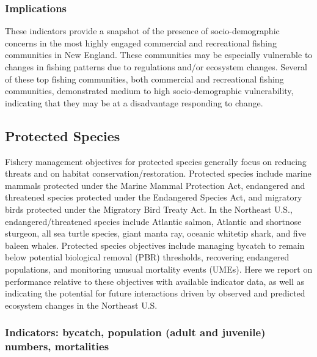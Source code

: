 \documentclass[
  10pt,
]{article}
\begin{document}
\hypertarget{implications-4}{%
\subsubsection{Implications}\label{implications-4}}

These indicators provide a snapshot of the presence of socio-demographic concerns in the most highly engaged commercial and recreational fishing communities in New England. These communities may be especially vulnerable to changes in fishing patterns due to regulations and/or ecosystem changes. Several of these top fishing communities, both commercial and recreational fishing communities, demonstrated medium to high socio-demographic vulnerability, indicating that they may be at a disadvantage responding to change.

\hypertarget{protected-species}{%
\subsection{Protected Species}\label{protected-species}}

Fishery management objectives for protected species generally focus on reducing threats and on habitat conservation/restoration. Protected species include marine mammals protected under the Marine Mammal Protection Act, endangered and threatened species protected under the Endangered Species Act, and migratory birds protected under the Migratory Bird Treaty Act. In the Northeast U.S., endangered/threatened species include Atlantic salmon, Atlantic and shortnose sturgeon, all sea turtle species, giant manta ray, oceanic whitetip shark, and five baleen whales. Protected species objectives include managing bycatch to remain below potential biological removal (PBR) thresholds, recovering endangered populations, and monitoring unusual mortality events (UMEs). Here we report on performance relative to these objectives with available indicator data, as well as indicating the potential for future interactions driven by observed and predicted ecosystem changes in the Northeast U.S.

\hypertarget{indicators-bycatch-population-adult-and-juvenile-numbers-mortalities}{%
\subsubsection{Indicators: bycatch, population (adult and juvenile) numbers, mortalities}\label{indicators-bycatch-population-adult-and-juvenile-numbers-mortalities}}
\end{document}
